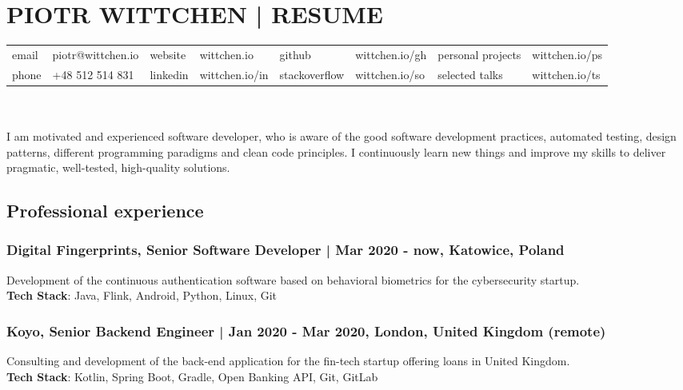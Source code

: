 \documentclass[8pt]{extarticle}
\begin{document}
  \small

  \section*{\large{PIOTR WITTCHEN | RESUME}}

  \begin{tabular}{llllllll}
      email  & piotr@wittchen.io & website  & wittchen.io    & github        & wittchen.io/gh & personal projects & wittchen.io/ps \\
      phone  & +48 512 514 831   & linkedin & wittchen.io/in & stackoverflow & wittchen.io/so & selected talks    & wittchen.io/ts \\
  \end{tabular} \\ \\

    I am motivated and experienced software developer, who is aware of the good software development practices, automated testing, design patterns, different programming paradigms and clean code principles. I continuously learn new things and improve my skills to deliver pragmatic, well-tested, high-quality solutions.

    \subsection*{\normalsize{Professional experience}}

      \subsubsection*{\normalsize{Digital Fingerprints, Senior Software Developer | Mar 2020 - now, Katowice, Poland}}
      Development of the continuous authentication software based on behavioral biometrics for the cybersecurity startup.\\
      \textbf{Tech Stack}: Java, Flink, Android, Python, Linux, Git

      \subsubsection*{\normalsize{Koyo, Senior Backend Engineer | Jan 2020 - Mar 2020, London, United Kingdom (remote)}}
      Consulting and development of the back-end application for the fin-tech startup offering loans in United Kingdom.\\
      \textbf{Tech Stack}: Kotlin, Spring Boot, Gradle, Open Banking API, Git, GitLab
\end{document}
